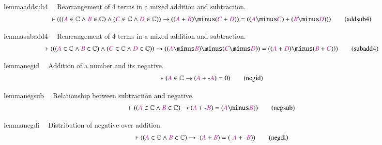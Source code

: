 \begin{restatable}{lemma}{addsub4}~~ Rearrangement of 4 terms in a mixed
addition and subtraction.
     ~
\begin{align}
\vdash ( ( ( \mc{A} \in \mathbb{C} \wedge \mc{B} \in \mathbb{C} ) \wedge (
    \mc{C} \in \mathbb{C} \wedge \mc{D} \in \mathbb{C} ) ) \rightarrow ( (
    \mc{A} + \mc{B} ) \minus ( \mc{C} + \mc{D} ) ) = ( ( \mc{A} \minus \mc{C} )
    + ( \mc{B} \minus \mc{D} ) ) )\label{eq:addsub4}\tag{addsub4}
\end{align}
\end{restatable}

\begin{restatable}{lemma}{subadd4}~~ Rearrangement of 4 terms in a mixed
addition and subtraction.
     ~
\begin{align}
\vdash ( ( ( \mc{A} \in \mathbb{C} \wedge \mc{B} \in \mathbb{C} ) \wedge (
    \mc{C} \in \mathbb{C} \wedge \mc{D} \in \mathbb{C} ) ) \rightarrow ( (
    \mc{A} \minus \mc{B} ) \minus ( \mc{C} \minus \mc{D} ) ) = ( ( \mc{A} +
    \mc{D} ) \minus ( \mc{B} + \mc{C} ) ) )\label{eq:subadd4}\tag{subadd4}
\end{align}
\end{restatable}

\begin{restatable}{lemma}{negid}~~ Addition of a number and its negative. 
~
\begin{align}
\vdash ( \mc{A} \in \mathbb{C} \rightarrow ( \mc{A} + \textrm{-} \mc{A} ) = 0
    )\label{eq:negid}\tag{negid}
\end{align}
\end{restatable}

\begin{restatable}{lemma}{negsub}~~ Relationship between subtraction and
negative.    ~
\begin{align}
\vdash ( ( \mc{A} \in \mathbb{C} \wedge \mc{B} \in \mathbb{C} ) \rightarrow (
    \mc{A} + \textrm{-} \mc{B} ) = ( \mc{A} \minus \mc{B} )
    )\label{eq:negsub}\tag{negsub}
\end{align}
\end{restatable}

\begin{restatable}{lemma}{negdi}~~ Distribution of negative over addition. 
~
     ~
\begin{align}
\vdash ( ( \mc{A} \in \mathbb{C} \wedge \mc{B} \in \mathbb{C} ) \rightarrow
    \textrm{-} ( \mc{A} + \mc{B} ) = ( \textrm{-} \mc{A} + \textrm{-} \mc{B} )
    )\label{eq:negdi}\tag{negdi}
\end{align}
\end{restatable}

